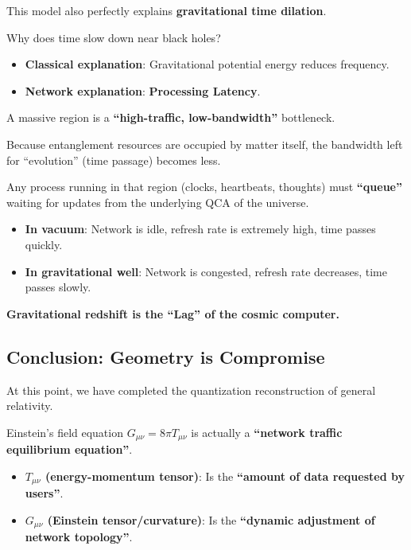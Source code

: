 This model also perfectly explains \textbf{gravitational time dilation}.

Why does time slow down near black holes?

\begin{itemize}
\item \textbf{Classical explanation}: Gravitational potential energy reduces frequency.

\item \textbf{Network explanation}: \textbf{Processing Latency}.
\end{itemize}

A massive region is a \textbf{``high-traffic, low-bandwidth''} bottleneck.

Because entanglement resources are occupied by matter itself, the bandwidth left for ``evolution'' (time passage) becomes less.

Any process running in that region (clocks, heartbeats, thoughts) must \textbf{``queue''} waiting for updates from the underlying QCA of the universe.

\begin{itemize}
\item \textbf{In vacuum}: Network is idle, refresh rate is extremely high, time passes quickly.

\item \textbf{In gravitational well}: Network is congested, refresh rate decreases, time passes slowly.
\end{itemize}

\textbf{Gravitational redshift is the ``Lag'' of the cosmic computer.}

\subsection{Conclusion: Geometry is Compromise}

At this point, we have completed the quantization reconstruction of general relativity.

Einstein's field equation $G_{\mu\nu} = 8\pi T_{\mu\nu}$ is actually a \textbf{``network traffic equilibrium equation''}.

\begin{itemize}
\item \textbf{$T_{\mu\nu}$ (energy-momentum tensor)}: Is the \textbf{``amount of data requested by users''}.

\item \textbf{$G_{\mu\nu}$ (Einstein tensor/curvature)}: Is the \textbf{``dynamic adjustment of network topology''}.
\end{itemize}

